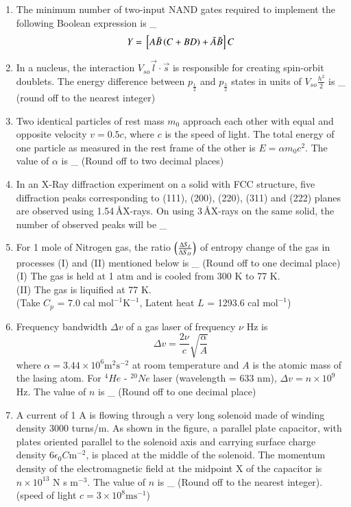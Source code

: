 \documentclass[journal]{IEEEtran}
\begin{document}
\begin{enumerate}
\item The minimum number of two-input NAND gates required to implement the following Boolean expression is \_
$$Y = {}\left[A\bar{B} \left(C + BD\right) + \bar{A}\bar{B}\right]C$$

\item In a nucleus, the interaction $V_{so}\vec{l}\cdot\vec{s}$ is responsible for creating spin-orbit doublets. The energy difference between $p_{\frac{1}{2}}$ and $p_{\frac{3}{2}}$ states in units of $V_{so}\frac{h^2}{2}$ is \_ (round off to the nearest integer)

\item Two identical particles of rest mass $m_0$ approach each other with equal and opposite velocity $v=0.5c$, where $c$ is the speed of light. The total energy of one particle as measured in the rest frame of the other is $E=\alpha m_0c^2$. The value of $\alpha$ is \_ (Round off to two decimal places)

\item In an X-Ray diffraction experiment on a solid with FCC structure, five diffraction peaks corresponding to (111), (200), (220), (311) and (222) planes are observed using 1.54\,\AA X-rays. On using 3\,\AA X-rays on the same solid, the number of observed peaks will be \_

\item For 1 mole of Nitrogen gas, the ratio $\left(\frac{\Delta S_I}{\Delta S_{II}}\right)$ of entropy change of the gas in processes (I) and (II) mentioned below is \_ (Round off to one decimal place)
\\
(I) The gas is held at 1 atm and is cooled from 300 K to 77 K.
\\
(II) The gas is liquified at 77 K.
\\
(Take $C_p$ = 7.0 cal $\mathrm{mol}^{-1}$$\mathrm{K}^{-1}$, Latent heat $L$ = 1293.6 cal $\mathrm{mol}^{-1}$)

\item Frequency bandwidth $\Delta v$ of a gas laser of frequency $\nu$ Hz is 
$$\Delta v = \frac{2\nu}{c} \sqrt{\frac{\alpha}{A}}$$
where $\alpha = 3.44 \times 10^6 \mathrm{m}^{2} \mathrm{s}^{-2}$ at room temperature and $A$ is the atomic mass of the lasing atom. For ${}^{4}He$ - ${}^{20}Ne$ laser (wavelength = 633 nm), $\Delta v = n \times 10^9$ Hz. The value of $n$ is \_ (Round off to one decimal place) 

\item A current of 1 A is flowing through a very long solenoid made of winding density 3000 turns/m. As shown in the figure, a parallel plate capacitor, with plates oriented parallel to the solenoid axis and carrying surface charge density $6\epsilon_0C\mathrm{m}^{-2}$, is placed at the middle of the solenoid. The momentum density of the electromagnetic field at the midpoint X of the capacitor is $n \times 10^{13}$ N s $\mathrm{m}^{-3}$. The value of $n$ is \_ (Round off to the nearest integer). 
\\ (speed of light $c = 3 \times 10^8 \mathrm{ms}^{-1}$)



\end{enumerate}
\end{document}
